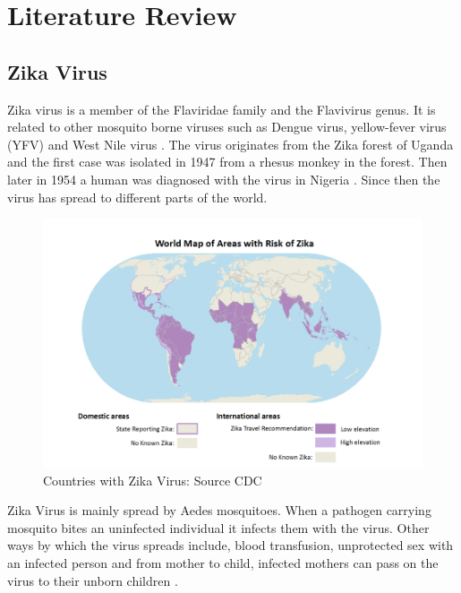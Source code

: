 \chapter{Literature Review}



\section{Zika Virus}
Zika virus is a member of the Flaviridae family
and the Flavivirus genus.
It is related to other mosquito borne viruses such as Dengue virus, yellow-fever  virus (YFV)  and West Nile virus \citep{doi}.
The virus originates from the Zika forest of Uganda and the first case was isolated in 1947 from a rhesus monkey in the forest. Then later in 1954 a human was diagnosed with the virus in Nigeria \citep{2015zika}. Since then the virus has spread to different parts of the world. 
\begin{figure}[h!]
\centering
\includegraphics[scale=0.5]{images/map_zika.png} 
\caption{Countries with Zika Virus: Source CDC}\label{fig 1}
\end{figure}


Zika Virus is mainly spread by Aedes mosquitoes. When a pathogen carrying mosquito bites an uninfected individual it infects them with the virus.
Other ways  by which the virus spreads include,
blood transfusion, unprotected sex with an infected person and from mother to child, infected mothers can pass on the virus to their unborn children \citep{musso2014}.

